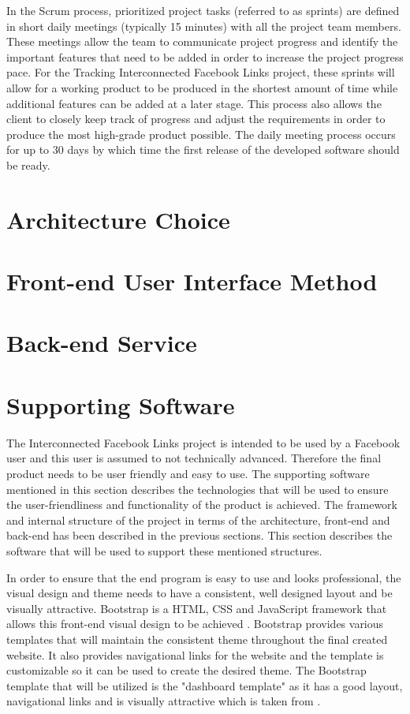 \documentclass[10pt,onecolumn]{article}
\begin{document}
In the Scrum process, prioritized project tasks (referred to as sprints) are defined in short daily meetings (typically 15 minutes) with all the project team members. These meetings allow the team to communicate project progress and identify the important features that need to be added in order to increase the project progress pace. For the Tracking Interconnected Facebook Links project, these sprints will allow for a working product to be produced in the shortest amount of time while additional features can be  added at a later stage. This process also allows the client to closely keep track of progress and adjust the requirements in order to produce the most high-grade product possible. The daily meeting process occurs for up to 30 days by which time the first release of the developed software should be ready.   


\section{Architecture Choice}

\section{Front-end User Interface Method}
\section{Back-end Service}
\section{Supporting Software}
The Interconnected Facebook Links project is intended to be used by a Facebook user and this user is assumed to not technically advanced. Therefore the final product needs to be user friendly and easy to use. The supporting software mentioned in this section describes the technologies that will be used to ensure the user-friendliness and functionality of the product is achieved. The framework and internal structure  of the project in terms of the architecture, front-end and back-end has been described in the previous sections. This section describes the software that will be used to support these mentioned structures.

In order to ensure that the end program is easy to use and looks professional, the visual design and theme needs to have a consistent, well designed layout and be visually attractive. Bootstrap is a HTML, CSS and JavaScript framework that allows this front-end visual design to be achieved \cite{Bootstrap}. Bootstrap provides various templates that will maintain the consistent theme throughout the final created website. It also provides navigational links for the website and the template is customizable so it can be used to create the desired theme. The Bootstrap template that will be utilized is the "dashboard template" as it has a good layout, navigational links and is visually attractive which is taken from \cite{Bootstrap}.
\end{document}
